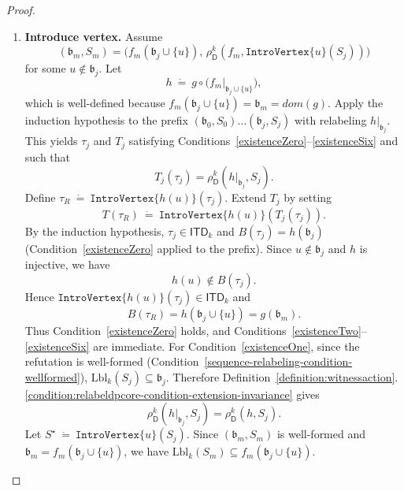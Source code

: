 \documentclass[11pt,a4paper]{article}
\newcommand{\treewidthvalue}{k}
\newcommand{\abag}{\mathfrak{b}}
\newcommand{\introvertextype}[1]{\mathtt{IntroVertex}\{#1\}}
\newcommand{\topbagname}{B}
\newcommand{\topbag}[1]{\topbagname(#1)}
\newcommand{\allabstractdecompositionstreewidth}[1]{\mathsf{ITD}_{#1}}
\newcommand{\abstractdecomposition}{\tau}
\newcommand{\defeq}{~\dot{=}~}
\newcommand{\vertexone}{u}
\newcommand{\dpcore}{\mathsf{D}}
\newcommand{\witnessset}{S}
\newcommand{\domain}{dom}
\newcommand{\dprefutation}{R}
\newcommand{\subtermToBag}{T}
\newcommand{\relabelingfunction}{f}
\newcommand{\action}{\rho}
\begin{document}
\begin{proof}
\begin{enumerate}
\item \textbf{Introduce vertex.}
Assume
\[
(\abag_m,\witnessset_m)
=
\bigl(\relabelingfunction_m(\abag_j\cup\{\vertexone\}),\,\action_{\dpcore}^{\treewidthvalue}(\relabelingfunction_m,\introvertextype{\vertexone}(\witnessset_j))\bigr)
	\]
	for some $\vertexone\notin \abag_j$.
	Let
	\[
	h \defeq g\circ \bigl(\relabelingfunction_m|_{\abag_j\cup\{\vertexone\}}\bigr),
	\]
	which is well-defined because $\relabelingfunction_m(\abag_j\cup\{\vertexone\})=\abag_m=\domain(g)$.
	Apply the induction hypothesis to the prefix $(\abag_0,\witnessset_0)\dots(\abag_j,\witnessset_j)$ with relabeling $h|_{\abag_j}$.
	This yields $\abstractdecomposition_j$ and $\subtermToBag_j$ satisfying Conditions~\ref{existenceZero}--\ref{existenceSix} and such that
	\[
	\subtermToBag_j(\abstractdecomposition_j)=\action_{\dpcore}^{\treewidthvalue}(h|_{\abag_j},\witnessset_j).
	\]
	Define $\abstractdecomposition_{\dprefutation}\defeq \introvertextype{h(\vertexone)}(\abstractdecomposition_j)$.
	Extend $\subtermToBag_j$ by setting
	\[
	\subtermToBag(\abstractdecomposition_{\dprefutation})\defeq \introvertextype{h(\vertexone)}(\subtermToBag_j(\abstractdecomposition_j)).
	\]
	By the induction hypothesis, $\abstractdecomposition_j\in \allabstractdecompositionstreewidth{\treewidthvalue}$ and $\topbag{\abstractdecomposition_j}=h(\abag_j)$ (Condition~\ref{existenceZero} applied to the prefix).
	Since $\vertexone\notin \abag_j$ and $h$ is injective, we have
	\[
	h(\vertexone)\notin \topbag{\abstractdecomposition_j}.
	\]
	Hence $\introvertextype{h(\vertexone)}(\abstractdecomposition_j)\in \allabstractdecompositionstreewidth{\treewidthvalue}$ and
	\[
	\topbag{\abstractdecomposition_{\dprefutation}}
	= h(\abag_j\cup\{\vertexone\})
	= g(\abag_m).
	\]
		Thus Condition~\ref{existenceZero} holds, and Conditions~\ref{existenceTwo}--\ref{existenceSix} are immediate.
		For Condition~\ref{existenceOne}, since the refutation is well-formed (Condition~\ref{sequence-relabeling-condition-wellformed}), $\mathrm{Lbl}_{\treewidthvalue}(\witnessset_j)\subseteq \abag_j$.
		Therefore Definition~\ref{definition:witnessaction}.\ref{condition:relabeldpcore-condition-extension-invariance} gives
		\[
		\action_{\dpcore}^{\treewidthvalue}(h|_{\abag_j},\witnessset_j)=\action_{\dpcore}^{\treewidthvalue}(h,\witnessset_j).
		\]
		Let $S^\star\defeq \introvertextype{\vertexone}(\witnessset_j)$.
		Since $(\abag_m,\witnessset_m)$ is well-formed and $\abag_m=\relabelingfunction_m(\abag_j\cup\{\vertexone\})$, we have $\mathrm{Lbl}_{\treewidthvalue}(\witnessset_m)\subseteq \relabelingfunction_m(\abag_j\cup\{\vertexone\})$.

\end{enumerate}
\end{proof}
\end{document}
